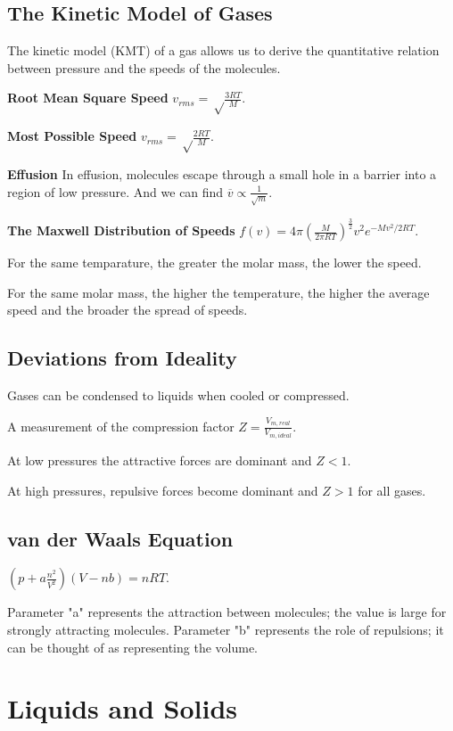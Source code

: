 \documentclass[a4paper,12pt]{article}
\begin{document}
\subsection{The Kinetic Model of Gases}
The kinetic model (KMT) of a gas allows us to derive the quantitative relation between pressure and the speeds of the molecules.\par
\textbf{Root Mean Square Speed} $v_{rms}=\sqrt\frac{3RT}{M}$.\par
\textbf{Most Possible Speed} $v_{rms}=\sqrt\frac{2RT}{M}$.\par
\textbf{Effusion} In effusion, molecules escape through a small hole in a barrier into a region of low pressure. And we can find $\overline{v}\propto \frac{1}{\sqrt{m}}$.\par
\textbf{The Maxwell Distribution of Speeds} $f(v)=4\pi (\frac{M}{2\pi RT})^{\frac{3}{2}}v^{2}e^{-Mv^{2}/2RT}$.\par
For the same temparature, the greater the molar mass, the lower the speed.\par
For the same molar mass, the higher the temperature, the higher the average speed and the broader the spread of speeds.
\subsection{Deviations from Ideality}
Gases can be condensed to liquids when cooled or compressed.\par
A measurement of the compression factor $Z=\frac{V_{m, real}}{V_{m, ideal}}$.\par
At low pressures the attractive forces are dominant and $Z<1$.\par
At high pressures, repulsive forces become dominant and $Z>1$ for all gases.\par
\subsection{van der Waals Equation} 
$(p+a\frac{n^{2}}{V^{2}})(V-nb)=nRT$.\par
Parameter "a" represents the attraction between molecules; the value is large for strongly attracting molecules.
Parameter "b" represents the role of repulsions; it can be thought of as representing the volume.

\newpage
\section{Liquids and Solids}
\end{document}
